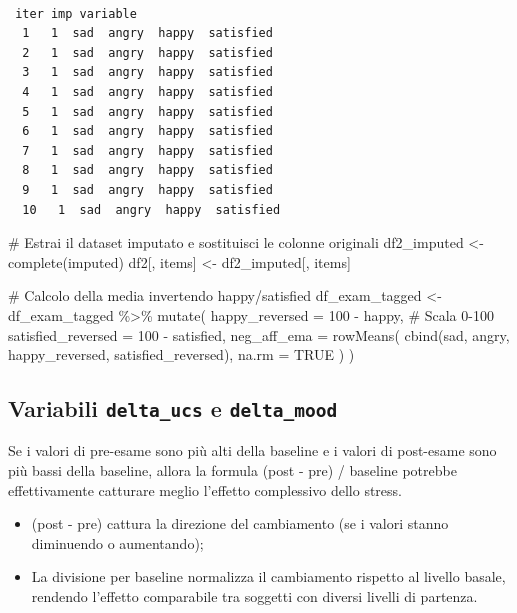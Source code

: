\documentclass[
  11pt,
  a4paper,
  onecolumn]{article}
\newenvironment{Shaded}{}{}
\newcommand{\AttributeTok}[1]{\textcolor[rgb]{0.84,0.23,0.29}{#1}}
\newcommand{\CommentTok}[1]{\textcolor[rgb]{0.42,0.45,0.49}{#1}}
\newcommand{\ConstantTok}[1]{\textcolor[rgb]{0.00,0.36,0.77}{#1}}
\newcommand{\DecValTok}[1]{\textcolor[rgb]{0.00,0.36,0.77}{#1}}
\newcommand{\FunctionTok}[1]{\textcolor[rgb]{0.44,0.26,0.76}{#1}}
\newcommand{\NormalTok}[1]{\textcolor[rgb]{0.14,0.16,0.18}{#1}}
\newcommand{\OtherTok}[1]{\textcolor[rgb]{0.44,0.26,0.76}{#1}}
\newcommand{\SpecialCharTok}[1]{\textcolor[rgb]{0.00,0.36,0.77}{#1}}
\providecommand{\tightlist}{%
  \setlength{\itemsep}{0pt}\setlength{\parskip}{0pt}}
\begin{document}
\begin{verbatim}

 iter imp variable
  1   1  sad  angry  happy  satisfied
  2   1  sad  angry  happy  satisfied
  3   1  sad  angry  happy  satisfied
  4   1  sad  angry  happy  satisfied
  5   1  sad  angry  happy  satisfied
  6   1  sad  angry  happy  satisfied
  7   1  sad  angry  happy  satisfied
  8   1  sad  angry  happy  satisfied
  9   1  sad  angry  happy  satisfied
  10   1  sad  angry  happy  satisfied
\end{verbatim}

\begin{Shaded}
\begin{Highlighting}[]
\CommentTok{\# Estrai il dataset imputato e sostituisci le colonne originali}
\NormalTok{df2\_imputed }\OtherTok{\textless{}{-}} \FunctionTok{complete}\NormalTok{(imputed)}
\NormalTok{df2[, items] }\OtherTok{\textless{}{-}}\NormalTok{ df2\_imputed[, items]}

\CommentTok{\# Calcolo della media invertendo happy/satisfied}
\NormalTok{df\_exam\_tagged }\OtherTok{\textless{}{-}}\NormalTok{ df\_exam\_tagged }\SpecialCharTok{\%\textgreater{}\%}
  \FunctionTok{mutate}\NormalTok{(}
    \AttributeTok{happy\_reversed =} \DecValTok{100} \SpecialCharTok{{-}}\NormalTok{ happy, }\CommentTok{\# Scala 0{-}100}
    \AttributeTok{satisfied\_reversed =} \DecValTok{100} \SpecialCharTok{{-}}\NormalTok{ satisfied,}
    \AttributeTok{neg\_aff\_ema =} \FunctionTok{rowMeans}\NormalTok{(}
      \FunctionTok{cbind}\NormalTok{(sad, angry, happy\_reversed, satisfied\_reversed),}
      \AttributeTok{na.rm =} \ConstantTok{TRUE}
\NormalTok{    )}
\NormalTok{  )}
\end{Highlighting}
\end{Shaded}

\subsection{\texorpdfstring{Variabili \texttt{delta\_ucs} e
\texttt{delta\_mood}}{Variabili delta\_ucs e delta\_mood}}\label{variabili-delta_ucs-e-delta_mood}

Se i valori di pre-esame sono più alti della baseline e i valori di
post-esame sono più bassi della baseline, allora la formula (post - pre)
/ baseline potrebbe effettivamente catturare meglio l'effetto
complessivo dello stress.

\begin{itemize}
\tightlist
\item
  (post - pre) cattura la direzione del cambiamento (se i valori stanno
  diminuendo o aumentando);
\item
  La divisione per baseline normalizza il cambiamento rispetto al
  livello basale, rendendo l'effetto comparabile tra soggetti con
  diversi livelli di partenza.
\end{itemize}
\end{document}
